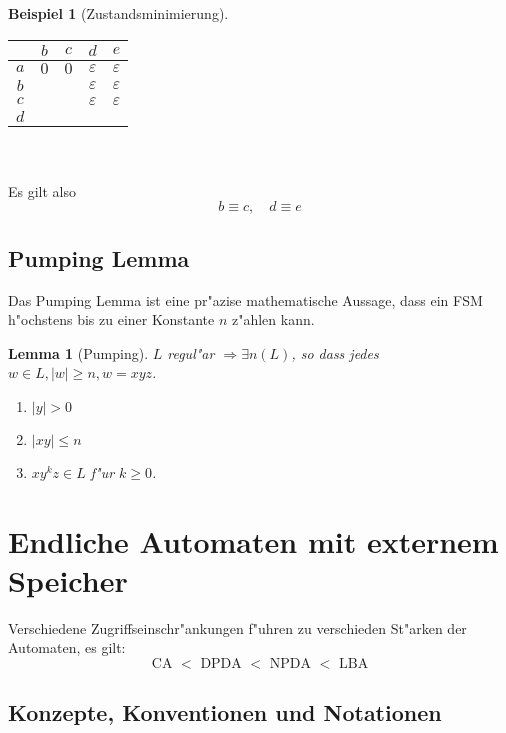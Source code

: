 \documentclass[german, 10pt, a4paper, twocolumn]{scrartcl}
\newtheorem{lemma}{Lemma}[section]
\theoremstyle{definition}
\theoremstyle{example}
\newtheorem{example}{Beispiel}[subsection]
\begin{document}
\begin{example}[Zustandsminimierung]
\begin{tabular}{c||c|c|c|c}
	&		$b$ &		$c$ &		$d$ &			$e$ \\ \hline \hline
	$a$ &		$0$ &		$0$ &		$\varepsilon$ &		$\varepsilon$ \\ \hline
	$b$ &		&		&		$\varepsilon$ &         $\varepsilon$ \\ \hline
	$c$ &		&		&		$\varepsilon$ &         $\varepsilon$ \\ \hline
	$d$ &		&		&		&         		\\ \hline
\end{tabular}
\\\\

Es gilt also
\begin{displaymath}
	b \equiv c, \quad d \equiv e
\end{displaymath}

\end{example}


\subsection{Pumping Lemma}

Das Pumping Lemma ist eine pr"azise mathematische Aussage, dass ein FSM h"ochstens bis zu einer Konstante $n$ z"ahlen kann.

\begin{lemma}[Pumping]
	$L$ regul"ar $\Rightarrow \exists n(L)$, so dass jedes $w \in L, |w| \geq n, w = xyz$.
	\begin{enumerate}
		\item $|y| > 0$
		\item $|xy| \leq n$
		\item $xy^k z \in L$ f"ur $k \geq 0$.
	\end{enumerate}
\end{lemma}

\section{Endliche Automaten mit externem Speicher}

Verschiedene Zugriffseinschr"ankungen f"uhren zu verschieden St"arken der Automaten, es gilt:
\begin{displaymath}
	\mbox{CA } <  \mbox{ DPDA } < \mbox{ NPDA } < \mbox{ LBA}
\end{displaymath}

\subsection{Konzepte, Konventionen und Notationen}
\end{document}
